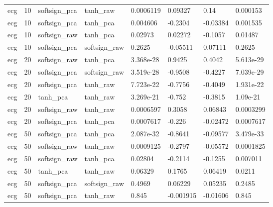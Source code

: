 \begin{table}[t]
\begin{tabular}{llllllll}
ecg & 10 & softsign_pca & tanh_raw & 0.0006119 & 0.09327 & 0.14 & 0.000153 \\
ecg & 10 & softsign_pca & tanh_pca & 0.004606 & -0.2304 & -0.03384 & 0.001535 \\
ecg & 10 & softsign_raw & tanh_pca & 0.02973 & 0.02272 & -0.1057 & 0.01487 \\
ecg & 10 & softsign_pca & softsign_raw & 0.2625 & -0.05511 & 0.07111 & 0.2625 \\
ecg & 20 & softsign_raw & tanh_pca & 3.368e-28 & 0.9425 & 0.4042 & 5.613e-29 \\
ecg & 20 & softsign_pca & softsign_raw & 3.519e-28 & -0.9508 & -0.4227 & 7.039e-29 \\
ecg & 20 & softsign_pca & tanh_raw & 7.723e-22 & -0.7756 & -0.4049 & 1.931e-22 \\
ecg & 20 & tanh_pca & tanh_raw & 3.269e-21 & -0.752 & -0.3815 & 1.09e-21 \\
ecg & 20 & softsign_raw & tanh_raw & 0.0006597 & 0.3058 & 0.06843 & 0.0003299 \\
ecg & 20 & softsign_pca & tanh_pca & 0.0007617 & -0.226 & -0.02472 & 0.0007617 \\
ecg & 50 & softsign_pca & tanh_pca & 2.087e-32 & -0.8641 & -0.09577 & 3.479e-33 \\
ecg & 50 & softsign_raw & tanh_raw & 0.0009125 & -0.2797 & -0.05572 & 0.0001825 \\
ecg & 50 & softsign_raw & tanh_pca & 0.02804 & -0.2114 & -0.1255 & 0.007011 \\
ecg & 50 & tanh_pca & tanh_raw & 0.06329 & 0.1765 & 0.06419 & 0.0211 \\
ecg & 50 & softsign_pca & softsign_raw & 0.4969 & 0.06229 & 0.05235 & 0.2485 \\
ecg & 50 & softsign_pca & tanh_raw & 0.845 & -0.001915 & -0.01606 & 0.845 \\
\bottomrule
\end{tabular}
\end{table}
